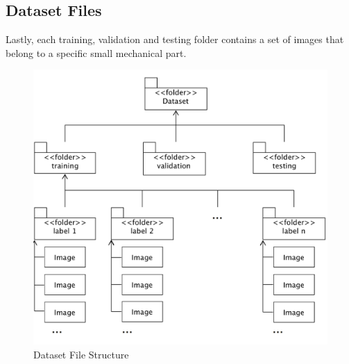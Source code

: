 \documentclass[a4paper,12pt,twoside]{report}
\begin{document}
\subsection{Dataset Files}
Lastly, each training, validation and testing folder contains a set of images that belong to a specific small mechanical part.


\begin{figure}[h]
\centering
  \includegraphics[width=\textwidth]{FS}
\caption{Dataset File Structure}
\label{fig:FS}
\end{figure}




\end{document}
